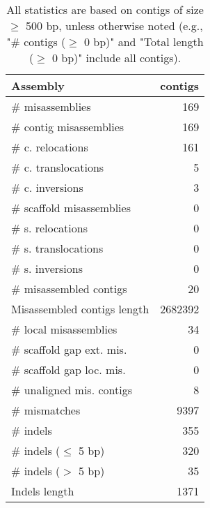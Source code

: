 \documentclass[12pt,a4paper]{article}
\begin{document}
\begin{table}[ht]
\begin{center}
\caption{All statistics are based on contigs of size $\geq$ 500 bp, unless otherwise noted (e.g., "\# contigs ($\geq$ 0 bp)" and "Total length ($\geq$ 0 bp)" include all contigs).}
\begin{tabular}{|l*{1}{|r}|}
\hline
Assembly & contigs \\ \hline
\# misassemblies & 169 \\ \hline
\hspace{2mm}\# contig misassemblies & 169 \\ \hline
\hspace{5mm}\# c. relocations & 161 \\ \hline
\hspace{5mm}\# c. translocations & 5 \\ \hline
\hspace{5mm}\# c. inversions & 3 \\ \hline
\hspace{2mm}\# scaffold misassemblies & 0 \\ \hline
\hspace{5mm}\# s. relocations & 0 \\ \hline
\hspace{5mm}\# s. translocations & 0 \\ \hline
\hspace{5mm}\# s. inversions & 0 \\ \hline
\# misassembled contigs & 20 \\ \hline
Misassembled contigs length & 2682392 \\ \hline
\# local misassemblies & 34 \\ \hline
\# scaffold gap ext. mis. & 0 \\ \hline
\# scaffold gap loc. mis. & 0 \\ \hline
\# unaligned mis. contigs & 8 \\ \hline
\# mismatches & 9397 \\ \hline
\# indels & 355 \\ \hline
\hspace{5mm}\# indels ($\leq$ 5 bp) & 320 \\ \hline
\hspace{5mm}\# indels ($>$ 5 bp) & 35 \\ \hline
Indels length & 1371 \\ \hline
\end{tabular}
\end{center}
\end{table}
\end{document}
